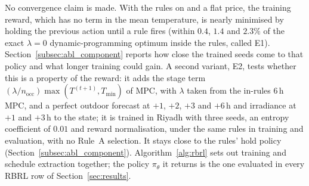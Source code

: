 \documentclass[pdflatex,sn-mathphys-num,iicol]{sn-jnl}
\theoremstyle{thmstyleone}\newtheorem{proposition}{Proposition}\newtheorem{corollary}{Corollary}
\theoremstyle{thmstyletwo}\newtheorem{remark}{Remark}\newtheorem{observation}{Observation}
\theoremstyle{thmstylethree}\newtheorem{definition}{Definition}
\newcommand{\Tmin}{T_{\min}}
\begin{document}
No convergence claim is made. With the rules on and a flat price, the training reward, which has no term in the mean temperature, is nearly minimised by holding the previous action until a rule fires (within $0.4$, $1.4$ and $2.3\%$ of the exact $\lambda=0$ dynamic-programming optimum inside the rules, called E1). Section~\ref{subsec:abl_component} reports how close the trained seeds come to that policy and what longer training could gain. A second variant, E2, tests whether this is a property of the reward: it adds the stage term $(\lambda/n_{\mathrm{occ}})\max(T^{(t+1)},\Tmin)$ of MPC, with $\lambda$ taken from the in-rules $6\,$h MPC, and a perfect outdoor forecast at $+1$, $+2$, $+3$ and $+6\,$h and irradiance at $+1$ and $+3\,$h to the state; it is trained in Riyadh with three seeds, an entropy coefficient of $0.01$ and reward normalisation, under the same rules in training and evaluation, with no Rule~A selection. It stays close to the rules' hold policy (Section~\ref{subsec:abl_component}). Algorithm~\ref{alg:rbrl} sets out training and schedule extraction together; the policy $\pi_\theta$ it returns is the one evaluated in every RBRL row of Section~\ref{sec:results}.
 
\end{document}
